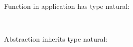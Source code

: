 \begin{fence}
\begin{code}%
\>[0]\AgdaFunction{\AgdaUnderscore{}}\AgdaSpace{}%
\AgdaSymbol{:}\AgdaSpace{}%
\AgdaSpace{}%
\AgdaSpace{}%
\AgdaSymbol{(}\AgdaSpace{}%
\AgdaSpace{}%
\AgdaSpace{}%
\AgdaSpace{}%
\AgdaSymbol{)}\AgdaSpace{}%
\AgdaSpace{}%
\AgdaSpace{}%
\AgdaSymbol{\AgdaUnderscore{}}\<%
\\
\>[0]\AgdaSymbol{\AgdaUnderscore{}}\AgdaSpace{}%
\AgdaSymbol{=}\AgdaSpace{}%
\<%
\end{code}
\end{fence}

Function in application has type natural:

\begin{fence}
\begin{code}%
\>[0]\AgdaFunction{\AgdaUnderscore{}}\AgdaSpace{}%
\AgdaSymbol{:}\AgdaSpace{}%
\AgdaSpace{}%
\AgdaSpace{}%
\AgdaSymbol{((}\AgdaSpace{}%
\AgdaSpace{}%
\AgdaSymbol{)}\AgdaSpace{}%
\AgdaSpace{}%
\AgdaSymbol{)}\AgdaSpace{}%
\AgdaSpace{}%
\AgdaSpace{}%
\AgdaSymbol{\AgdaUnderscore{}}\<%
\\
\>[0]\AgdaSymbol{\AgdaUnderscore{}}\AgdaSpace{}%
\AgdaSymbol{=}\AgdaSpace{}%
\<%
\end{code}
\end{fence}

Abstraction inherits type natural:

\begin{fence}
\begin{code}%
\>[0]\AgdaFunction{\AgdaUnderscore{}}\AgdaSpace{}%
\AgdaSymbol{:}\AgdaSpace{}%
\AgdaSpace{}%
\AgdaSpace{}%
\AgdaSymbol{(}\AgdaSpace{}%
\AgdaSpace{}%
\AgdaSymbol{)}\AgdaSpace{}%
\AgdaSpace{}%
\AgdaSpace{}%
\AgdaSymbol{\AgdaUnderscore{}}\<%
\\
\>[0]\AgdaSymbol{\AgdaUnderscore{}}\AgdaSpace{}%
\AgdaSymbol{=}\AgdaSpace{}%
\<%
\end{code}
\end{fence}

